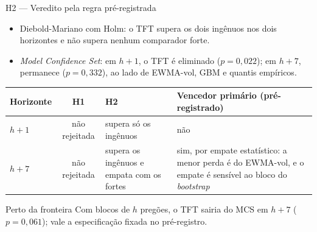 \documentclass[aspectratio=169,10pt]{beamer}
\newcommand{\hum}{\(h{+}1\)}
\newcommand{\hsete}{\(h{+}7\)}
\begin{document}
\begin{frame}{H2 --- Veredito pela regra pré-registrada}
  \small
  \begin{itemize}
    \item Diebold-Mariano com Holm: o TFT supera os dois ingênuos nos dois horizontes
      e não supera nenhum comparador forte.
    \item \textit{Model Confidence Set}: em \hum, o TFT é eliminado (\(p = 0{,}022\));
      em \hsete, permanece (\(p = 0{,}332\)), ao lado de EWMA-vol, GBM e quantis empíricos.
  \end{itemize}
  \vspace{2pt}
  \centering
  \begin{tabular}{l c >{\raggedright\arraybackslash}p{3.3cm} >{\raggedright\arraybackslash}p{5.6cm}}
    \toprule
    Horizonte & H1 & H2 & Vencedor primário (pré-registrado) \\
    \midrule
    \hum & não rejeitada & supera só os ingênuos & não \\
    \addlinespace
    \hsete & não rejeitada & supera os ingênuos e empata com os fortes
      & sim, por \alert{empate estatístico}: a menor perda é do EWMA-vol, e o empate
        é sensível ao bloco do \textit{bootstrap} \\
    \bottomrule
  \end{tabular}

  \vspace{2pt}
  \raggedright
  \begin{alertblock}{Perto da fronteira}
    Com blocos de \(h\) pregões, o TFT sairia do MCS em \hsete{} (\(p = 0{,}061\));
    vale a especificação fixada no pré-registro.
  \end{alertblock}
\end{frame}
\end{document}
